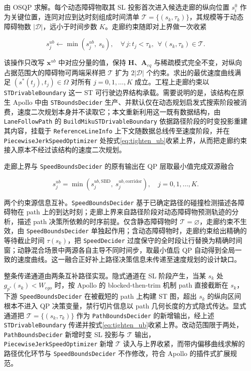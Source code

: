 \documentclass[a4paper,11pt]{ctexart}
\theoremstyle{definition}
\begin{document}
由 OSQP 求解。每个动态障碍物取其 SL 投影首次进入候选走廊的纵向位置 $s_i^{0}$ 作为关键位置，连同对应到达时刻组成时间清单 $\mathcal{T} = \{(s_k, \tau_k)\}$，其规模等于动态障碍物数 $|\mathcal{D}|$，远小于时间步数 $K$。走廊约束随即对上界做一次收紧

\begin{equation}
    s_j^{ub} \leftarrow \min\!\left(s_j^{ub},\ s_k\right), \quad \forall\, j: t_j < \tau_k,\ \ \forall\, (s_k, \tau_k) \in \mathcal{T}.
    \label{eq:tighten_ub}
\end{equation}

该操作只改写 $\mathbf{x}^{ub}$ 中对应分量的值，保持 $\mathbf{H}$、$\mathbf{A}_{eq}$ 与稀疏模式完全不变，对纵向占据范围大的障碍物可两端采样把 $\mathcal{T}$ 扩为 $2|\mathcal{D}|$ 个约束。求出的最优速度曲线满足 $(s^{*}(t_j), t_j) \in \Omega$ 对所有 $j=0,1,\ldots,K$ 成立。工程上走廊约束以 \texttt{STDrivableBoundary} 这一 ST 可行驶边界结构承载。需要说明的是，该结构在原生 Apollo 中由 \texttt{STBoundsDecider} 生产、并默认仅在动态规划启发式搜索阶段被消费，速度二次规划本身并不读取它；本文重新利用这一既有数据结构，由 \texttt{LaneFollowPath} 的 \texttt{BuildMikuSTDrivableBoundary} 依据路径阶段的时变投影重建其内容，挂载于 \texttt{ReferenceLineInfo} 上下文随数据总线传至速度阶段，并在 \texttt{PiecewiseJerkSpeedOptimizer} 处按式\eqref{eq:tighten_ub}收紧上界，从而把走廊约束接入原本不经过该结构的速度二次规划。

走廊上界与 \texttt{SpeedBoundsDecider} 的原有输出在 QP 层取最小值完成双源融合

\begin{equation}
    s_j^{ub} = \min\!\left(s_j^{ub,\mathrm{SBD}},\ s_j^{ub,\mathrm{corridor}}\right), \quad j = 0,1,\ldots,K.
    \label{eq:dual_source}
\end{equation}

两个约束源信息互补。\texttt{SpeedBoundsDecider} 基于已确定路径的碰撞检测描述各障碍物在 path 上的到达时刻；走廊上界来自路径阶段对动态障碍物预测轨迹的分析，描述 path 决策所依赖的时序前提。仅含静态障碍物时 $\mathcal{T}=\varnothing$，走廊约束不生效，由 \texttt{SpeedBoundsDecider} 单独起作用；含动态障碍物时，走廊约束给出精确的等待截止时间 $\tau(s_k)$，把 \texttt{SpeedDecider} 过度保守的全时段让行替换为精确时间窗；动静混合场景中两源各自主导不同时间步，取最小值后 QP 自动得到全局一致的速度曲线。这一融合正好补上路径决策信息未传递至速度规划的设计缺口。

整条传递通道由两条互补路径实现。隐式通道在 SL 阶段产生，当某 $s_k$ 处 $g_{p^{*}}(s_k)<W_{ego}$ 时，按 Apollo 的 blocked-then-trim 机制 path 直接截断在 $s_k$，下游 \texttt{SpeedBoundsDecider} 在被截短的 path 上构建 ST 图，超出 $s_k$ 的纵向区间根本不进入 QP 决策变量，禁行切片信息以 path 几何长度的方式隐式传达。显式通道把 $\mathcal{T}=\{(s_k, \tau_k)\}$ 作为 \texttt{PathBoundsDecider} 的新增输出，经上述 \texttt{STDrivableBoundary} 传递并按式\eqref{eq:tighten_ub}收紧上界。改动范围限于两处，\texttt{PathBoundsDecider} 新增时变 SL 投影与 $\mathcal{T}$ 输出，\texttt{PiecewiseJerkSpeedOptimizer} 新增 $\mathcal{T}$ 读入与上界收紧，而带内偏移曲线求解的路径优化环节与 \texttt{SpeedBoundsDecider} 不作修改，符合 Apollo 的插件式扩展规范。
\end{document}
